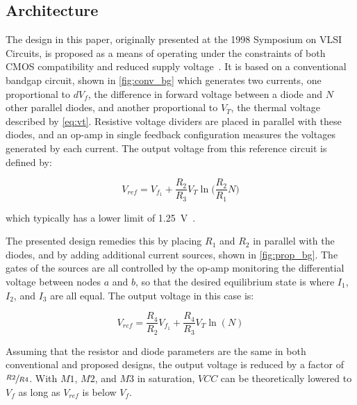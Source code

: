 \documentclass[journal]{IEEEtran}
\begin{document}
\subsection{Architecture}

The design in this paper, originally presented at the 1998 Symposium on VLSI Circuits, is proposed as a means of operating under the constraints of both CMOS compatibility and reduced supply voltage~\cite{Banba1998}. It is based on a conventional bandgap circuit, shown in \cref{fig:conv_bg} which generates two currents, one proportional to \(dV_f\), the difference in forward voltage between a diode and \(N\) other parallel diodes, and another proportional to \(V_T\), the thermal voltage described by \cref{eq:vt}. Resistive voltage dividers are placed in parallel with these diodes, and an op-amp in single feedback configuration measures the voltages generated by each current. The output voltage from this reference circuit is defined by:

\begin{equation}
    V_{ref} = V_{f_1} + \frac{R_2}{R_3}V_T\ln\Biggl(\frac{R_2}{R_1}N\Biggr)
\label{eq:conv_vout}
\end{equation}

\noindent which typically has a lower limit of \qty{1.25}{\V}~\cite{Razavi2016}. 

The presented design remedies this by placing \(R_1\) and \(R_2\) in parallel with the diodes, and by adding additional current sources, shown in \cref{fig:prop_bg}. The gates of the sources are all controlled by the op-amp monitoring the differential voltage between nodes \(a\) and \(b\), so that the desired equilibrium state is where \(I_1\), \(I_2\), and \(I_3\) are all equal. The output voltage in this case is:

\begin{equation}
    V_{ref} = \frac{R_4}{R_2}V_{f_1} + \frac{R_4}{R_3}V_T \ln{(N)}
\label{eq:banba_vout}
\end{equation}

\noindent Assuming that the resistor and diode parameters are the same in both conventional and proposed designs, the output voltage is reduced by a factor of \(\sfrac{R2}{R4}\). With \(M1\), \(M2\), and \(M3\) in saturation, \(VCC\) can be theoretically lowered to \(V_f\) as long as \(V_{ref}\) is below \(V_f\).
\end{document}
